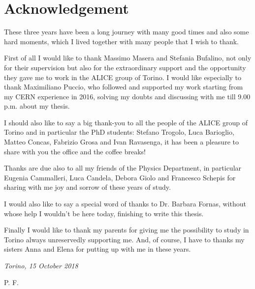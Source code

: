 %
\chapter*{Acknowledgement}
\label{sec:acknowledgement}
\vspace*{-10mm}


These three years have been a long journey with many good times and also some hard moments, which I
lived together with many people that I wish to thank.

First of all I would like to thank Massimo Masera and Stefania Bufalino, not only for their 
supervision but also for the extraordinary support and the opportunity they gave me to work in the
ALICE group of Torino.
I would like especially to thank Maximiliano Puccio, who followed and supported my work starting from
my CERN experience in 2016, solving my doubts and discussing with me till 9.00 p.m. about my thesis.

I should also like to say a big thank-you to all the people of the ALICE group of Torino and
in particular the PhD students: Stefano Trogolo, Luca Barioglio, Matteo Concas, Fabrizio Grosa and 
Ivan Ravasenga, it has been a pleasure to share with you the office and the coffee breaks!

Thanks are due also to all my friends of the Physics Department, in particular Eugenia Cammalleri,
Luca Candela, Debora Giolo and Francesco Schepis for sharing with me joy and sorrow of these years
of study.

I would also like to say a special word of thanks to Dr. Barbara Fornas, without whose help
I wouldn't be here today, finishing to write this thesis.

Finally I would like to thank my parents for giving me the possibility to study in Torino
always unreservedly supporting me.
And, of course, I have to thanks my sisters Anna and Elena for putting up with me in these years.

\textit{Torino, 15 October 2018} \begin{flushright} P. F. \end{flushright}